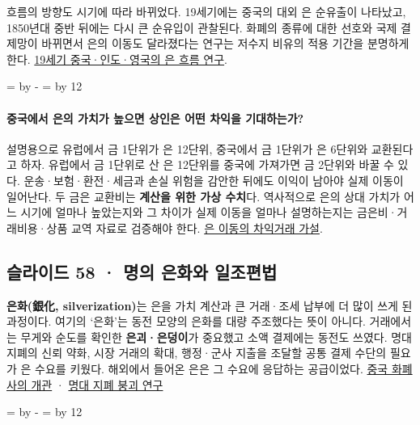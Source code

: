 \documentclass[10pt,a4paper]{article}
\newcommand{\ReserveQuestionSpace}{%
  \par\begingroup
  \dimen0=\pagegoal \advance\dimen0 by -\pagetotal
  \dimen2=\baselineskip \multiply\dimen2 by 12
  \ifdim\dimen0<\dimen2 \newpage\fi
  \endgroup}
\begin{document}
흐름의 방향도 시기에 따라 바뀌었다. 19세기에는 중국의 대외 은 순유출이 나타났고, 1850년대 중반 뒤에는 다시 큰 순유입이 관찰된다. 화폐의 종류에 대한 선호와 국제 결제망이 바뀌면서 은의 이동도 달라졌다는 연구는 저수지 비유의 적용 기간을 분명하게 한다. \href{https://onlinelibrary.wiley.com/doi/10.1111/ehr.70020}{19세기 중국·인도·영국의 은 흐름 연구}.\par

\ReserveQuestionSpace
\paragraph{중국에서 은의 가치가 높으면 상인은 어떤 차익을 기대하는가?}
설명용으로 유럽에서 금 1단위가 은 12단위, 중국에서 금 1단위가 은 6단위와 교환된다고 하자. 유럽에서 금 1단위로 산 은 12단위를 중국에 가져가면 금 2단위와 바꿀 수 있다. 운송·보험·환전·세금과 손실 위험을 감안한 뒤에도 이익이 남아야 실제 이동이 일어난다. 두 금은 교환비는 \textbf{계산을 위한 가상 수치}다. 역사적으로 은의 상대 가치가 어느 시기에 얼마나 높았는지와 그 차이가 실제 이동을 얼마나 설명하는지는 금은비·거래비용·상품 교역 자료로 검증해야 한다. \href{https://brill.com/view/journals/jesh/38/4/article-p429\_2.xml?language=en}{은 이동의 차익거래 가설}.\par

\subsection{슬라이드 58 · 명의 은화와 일조편법}
\textbf{은화(銀化, silverization)}는 은을 가치 계산과 큰 거래·조세 납부에 더 많이 쓰게 된 과정이다. 여기의 ‘은화’는 동전 모양의 은화를 대량 주조했다는 뜻이 아니다. 거래에서는 무게와 순도를 확인한 \textbf{은괴·은덩이}가 중요했고 소액 결제에는 동전도 쓰였다. 명대 지폐의 신뢰 약화, 시장 거래의 확대, 행정·군사 지출을 조달할 공통 결제 수단의 필요가 은 수요를 키웠다. 해외에서 들어온 은은 그 수요에 응답하는 공급이었다. \href{https://www.jstor.org/stable/jj.5233106}{중국 화폐사의 개관} · \href{https://www.sciencedirect.com/science/article/abs/pii/0164070495801014}{명대 지폐 붕괴 연구}\par

\ReserveQuestionSpace
\end{document}
